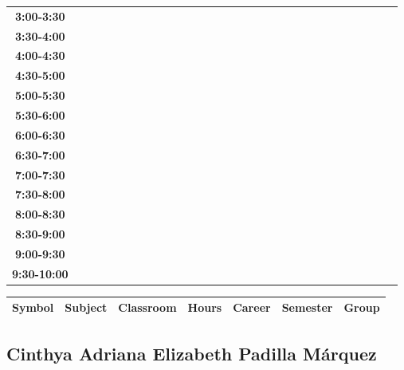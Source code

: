 \documentclass{article}
\begin{document}
\begin{table}[ht]
\begin{tabular}{|c|c|c|c|c|c|c|c|c|c|c|c|c|c|c|c|c|c|c|c|c|c|c|c|c|c|c|c|c|c|}
\textbf{3:00-3:30} &   &   &   &   &   &   &   \\
 \cline{1-8} 
\textbf{3:30-4:00} &   &   &   &   &   &   &   \\
 \cline{1-8} 
\textbf{4:00-4:30} &   &   &   &   &   &   &   \\
 \cline{1-8} 
\textbf{4:30-5:00} &   &   &   &   &   &   &   \\
 \cline{1-8} 
\textbf{5:00-5:30} &   &   &   &   &   &   &   \\
 \cline{1-8} 
\textbf{5:30-6:00} &   &   &   &   &   &   &   \\
 \cline{1-8} 
\textbf{6:00-6:30} &   &   &   &   &   &   &   \\
 \cline{1-8} 
\textbf{6:30-7:00} &   &   &   &   &   &   &   \\
 \cline{1-8} 
\textbf{7:00-7:30} &   &   &   &   &   &   &   \\
 \cline{1-8} 
\textbf{7:30-8:00} &   &   &   &   &   &   &   \\
 \cline{1-8} 
\textbf{8:00-8:30} &   &   &   &   &   &   &   \\
 \cline{1-8} 
\textbf{8:30-9:00} &   &   &   &   &   &   &   \\
 \cline{1-8} 
\textbf{9:00-9:30} &   &   &   &   &   &   &   \\
 \cline{1-8} 
\textbf{9:30-10:00} &   &   &   &   &   &   &   \\
 \cline{1-8} 
\end{tabular}\end{table}

        
        \begin{tabular}{|>{\centering\arraybackslash}m{2cm}|>{\centering\arraybackslash}m{4cm}|>{\centering\arraybackslash}m{2cm}|>{\centering\arraybackslash}m{2cm}|>{\centering\arraybackslash}m{2cm}|>{\centering\arraybackslash}m{2cm}|>{\centering\arraybackslash}m{2cm}|}
        \hline
        \textbf{Symbol} & \textbf{Subject} & \textbf{Classroom} & \textbf{Hours} & \textbf{Career} & \textbf{Semester} & \textbf{Group} \\
        \hline
        \end{tabular}
                    

        \newpage
        

        \subsection{Cinthya Adriana Elizabeth Padilla M\'arquez}
        \vspace*{.1cm}
        
\end{document}
